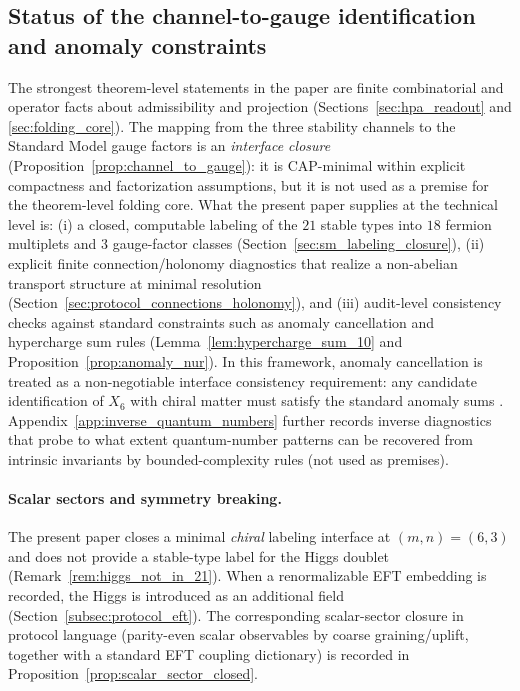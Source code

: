 \subsection{Status of the channel-to-gauge identification and anomaly constraints}
The strongest theorem-level statements in the paper are finite combinatorial and operator facts about admissibility and projection (Sections~\ref{sec:hpa_readout} and \ref{sec:folding_core}).
The mapping from the three stability channels to the Standard Model gauge factors is an \emph{interface closure} (Proposition~\ref{prop:channel_to_gauge}): it is CAP-minimal within explicit compactness and factorization assumptions, but it is not used as a premise for the theorem-level folding core.
What the present paper supplies at the technical level is:
(i) a closed, computable labeling of the $21$ stable types into $18$ fermion multiplets and $3$ gauge-factor classes (Section~\ref{sec:sm_labeling_closure}),
(ii) explicit finite connection/holonomy diagnostics that realize a non-abelian transport structure at minimal resolution (Section~\ref{sec:protocol_connections_holonomy}),
and (iii) audit-level consistency checks against standard constraints such as anomaly cancellation and hypercharge sum rules (Lemma~\ref{lem:hypercharge_sum_10} and Proposition~\ref{prop:anomaly_nur}).
In this framework, anomaly cancellation is treated as a non-negotiable interface consistency requirement: any candidate identification of $X_6$ with chiral matter must satisfy the standard anomaly sums \cite{PeskinSchroeder1995,PDGRPP2024}.
Appendix~\ref{app:inverse_quantum_numbers} further records inverse diagnostics that probe to what extent quantum-number patterns can be recovered from intrinsic invariants by bounded-complexity rules (not used as premises).

\paragraph{Scalar sectors and symmetry breaking.}
The present paper closes a minimal \emph{chiral} labeling interface at $(m,n)=(6,3)$ and does not provide a stable-type label for the Higgs doublet (Remark~\ref{rem:higgs_not_in_21}).
When a renormalizable EFT embedding is recorded, the Higgs is introduced as an additional field (Section~\ref{subsec:protocol_eft}).
The corresponding scalar-sector closure in protocol language (parity-even scalar observables by coarse graining/uplift, together with a standard EFT coupling dictionary) is recorded in Proposition~\ref{prop:scalar_sector_closed}.

